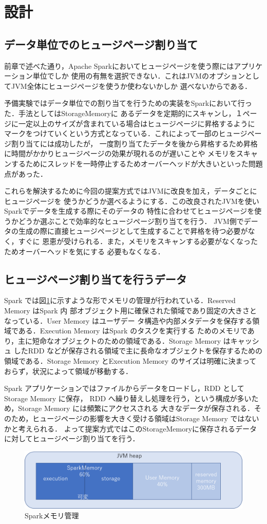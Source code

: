 \section{設計} \label{section:design}

\subsection{データ単位でのヒュージページ割り当て}
前章で述べた通り，Apache Sparkにおいてヒュージページを使う際にはアプリケーション単位でしか
使用の有無を選択できない．これはJVMのオプションとしてJVM全体にヒュージページを使うか使わないかしか
選べないからである．

予備実験ではデータ単位での割り当てを行うための実装をSparkにおいて行った．手法としてはStorageMemoryに
あるデータを定期的にスキャンし，１ページに一定以上のサイズが含まれている場合はヒュージページに昇格するように
マークをつけていくという方式となっている．これによって一部のヒュージページ割り当てには成功したが，
一度割り当てたデータを後から昇格するため昇格に時間がかかりヒュージページの効果が現れるのが遅いことや
メモリをスキャンするためにスレッドを一時停止するためオーバーヘッドが大きいといった問題点があった．

これらを解決するために今回の提案方式ではJVMに改良を加え，データごとにヒュージページを
使うかどうか選べるようにする．この改良されたJVMを使いSparkでデータを生成する際にそのデータの
特性に合わせてヒュージページを使うかどうか選ぶことで効率的なヒュージページ割り当てを行う．
JVM側でデータの生成の際に直接ヒュージページとして生成することで昇格を待つ必要がなく，すぐに
恩恵が受けられる．また，メモリをスキャンする必要がなくなったためオーバーヘッドを気にする
必要もなくなる．

\subsection{ヒュージページ割り当てを行うデータ}
Spark では図\ref{fig:spark-memory-management}に示すような形でメモリの管理が行われている\cite{spark-memory-management}．Reserved Memory はSpark 内
部オブジェクト用に確保された領域であり固定の大きさとなっている．User Memory はユーザデー
タ構造や内部メタデータを保存する領域である．Execution Memory はSpark のタスクを実行する
ためのメモリであり，主に短命なオブジェクトのための領域である．Storage Memory はキャッシュ
したRDD などが保存される領域で主に長命なオブジェクトを保存するための領域である．Storage
Memory とExecution Memory のサイズは明確に決まっておらず，状況によって領域が移動する．

Spark アプリケーションではファイルからデータをロードし，RDD としてStorage Memory に保存，
RDD へ繰り替えし処理を行う，という構成が多いため，Storage Memory には頻繁にアクセスされる
大きなデータが保存される．そのため，ヒュージページの影響を大きく受ける領域はStorage Memory
ではないかと考えられる．
よって提案方式ではこのStorageMemoryに保存されるデータに対してヒュージページ割り当てを行う．

\begin{figure}
  \centering
  \includegraphics[scale=0.3]{figures/spark-memory-management.png}
  \caption{Sparkメモリ管理}
  \label{fig:spark-memory-management}
\end{figure}
